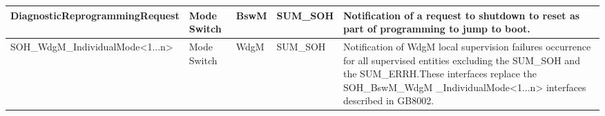 \begin{longtable}{|l|l|l|l|l|}
\begin{minipage}{0.42\linewidth}\raggedright\vspace{.75ex}DiagnosticReprogrammingRequest\vspace{.75ex}\end{minipage} & \begin{minipage}{0.07\linewidth}\raggedright\vspace{.75ex}Mode Switch\vspace{.75ex}\end{minipage} & \begin{minipage}{0.10\linewidth}\raggedright\vspace{.75ex}BswM\vspace{.75ex}\end{minipage} & \begin{minipage}{0.10\linewidth}\raggedright\vspace{.75ex}SUM\_SOH\vspace{.75ex}\end{minipage} & \begin{minipage}{0.17\linewidth}\raggedright\vspace{.75ex}Notification of a request to shutdown to reset as part of programming to jump to boot.\vspace{.75ex}\end{minipage}\\\hline
\begin{minipage}{0.42\linewidth}\raggedright\vspace{.75ex}SOH\_WdgM\_IndividualMode<1...n>\vspace{.75ex}\end{minipage} & \begin{minipage}{0.07\linewidth}\raggedright\vspace{.75ex}Mode Switch\vspace{.75ex}\end{minipage} & \begin{minipage}{0.10\linewidth}\raggedright\vspace{.75ex}WdgM\vspace{.75ex}\end{minipage} & \begin{minipage}{0.10\linewidth}\raggedright\vspace{.75ex}SUM\_SOH\vspace{.75ex}\end{minipage} & \begin{minipage}{0.17\linewidth}\raggedright\vspace{.75ex}Notification of WdgM local supervision failures occurrence for all supervised entities excluding the SUM\_SOH and the SUM\_ERRH.\newline \footnotesize{These interfaces replace the SOH\_BswM\_WdgM \_IndividualMode<1...n> interfaces described in GB8002.}\vspace{.75ex}\end{minipage}\\\hline

\end{longtable}
